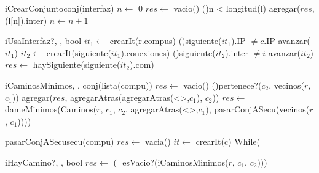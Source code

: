 \begin{Algoritmos}
   \begin{algoritmo}{iCrearConjunto}{}{conj(interfaz)}{}
     $n \gets$ 0
    $res \gets$ vacio()
   \While(){n < longitud(l)}{
      agregar($res$, (l[n]).inter)
      $n \gets n+1$
    }
  \end{algoritmo} 

  \begin{algoritmo}{iUsaInterfaz?}{, , }{bool}{}
     $it_{1} \gets$ crearIt(r.compus)
    \While(){siguiente($it_{1}$).IP $\neq c$.IP}{
      avanzar($it_{1}$)
    }
     $it_{2} \gets$ crearIt(siguiente($it_{1}$).conexiones)
    \While(){siguiente($it_{2}$).inter $\neq i$}{
     avanzar($it_{2}$)
    }
    $res \gets$ haySiguiente(siguiente($it_{2}$).com)
  \end{algoritmo}
   
  \begin{algoritmo}{iCaminosMinimos}{, , }{conj(lista(compu))}{}
    $res \gets$ vacio()
    \eIf(){pertenece?($c_{2}$, vecinos($r$, $c_{1}$))}{
      agregar($res$, agregarAtras(agregarAtras(<>,$c_{1}$), $c_{2}$))
    }{
      $res \gets$ dameMinimos(Caminos($r$, $c_{1}$, $c_{2}$, agregarAtras(<>,$c_{1}$), pasarConjASecu(vecinos($r$, $c_{1}$))))\;
    }
  \end{algoritmo}
    
	\begin{algoritmo}{pasarConjASecu}{}{secu(compu)}{}
		$res \gets$ vacia()
		 $it \gets$ crearIt(c)
		While(
	\end{algoritmo}    
     
  \begin{algoritmo}{iHayCamino?}{, , }{bool}{}
    $res \gets$ ($\neg$esVacio?(iCaminosMinimos($r$, $c_{1}$, $c_{2}$)))
  \end{algoritmo}


\end{Algoritmos}
